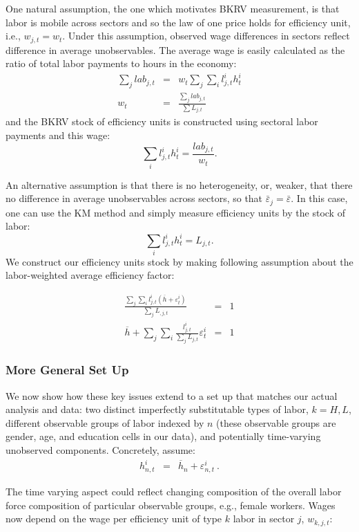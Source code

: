 \documentclass[10pt]{article}
\begin{document}
One natural assumption, the one which motivates BKRV measurement, is that labor is mobile across sectors and so the law of one price holds for efficiency unit, i.e., $w_{j,t}=w_{t}$. Under this assumption, observed wage differences in sectors reflect difference in average unobservables. The average wage is easily calculated as the ratio of total labor payments to hours in the economy:\\
\begin{eqnarray*}
\sum_{j}lab_{j,t} & = & w_{t}\sum_{j}\sum_{i}l_{j,t}^{i}h_{t}^{i}\\
w_{t} & = & \frac{\sum_{j}lab_{j,t}}{\sum L_{j,t}} \, 
\end{eqnarray*}
and the BKRV stock of efficiency units is constructed using sectoral labor payments and this wage:
$$\sum_{i}l_{j,t}^{i}h_{t}^{i}=\frac{lab_{j,t}}{w_{t}}.$$

An alternative assumption is that there is no heterogeneity, or, weaker, that there no difference in average unobservables across sectors, so that $\bar{\varepsilon}_{j}=\bar{\varepsilon}$. In this case, one can use the KM method and simply measure efficiency units by the stock of labor: 
$$\sum_{i}l_{j,t}^{i}h_{t}^{i}=L_{j,t}.$$
We construct our efficiency units stock by making following assumption about the labor-weighted average efficiency factor:

\begin{eqnarray*}
\frac{\sum_{j}\sum_{i}l_{j,t}^{i}\left(\overline{h}+\varepsilon^{i}_{t}\right)}{\sum_{j}L_{,j,t}} & = & 1\\
\overline{h}+\sum_{j}\sum_{i}\frac{l_{j,t}^{i}}{\sum_{j}L_{j,t}}\varepsilon^{i}_{t} & = & 1
\end{eqnarray*}

\subsubsection{More General Set Up}
We now show how these key issues extend to a set up that matches our actual analysis and data: two distinct imperfectly substitutable types of labor, $k=H,L$, different observable groups of labor indexed by $n$ (these observable groups are gender, age, and education cells in our data), and potentially time-varying unobserved components. Concretely, assume:
\begin{eqnarray*}
h_{n,t}^{i} & = & \overline{h}_{n}+\varepsilon_{n,t}^{i} \ .
\end{eqnarray*}

The time varying aspect could reflect changing composition of the overall labor force composition of particular observable groups, e.g., female workers. Wages now depend on the wage per efficiency unit of type $k$ labor in sector $j$, $w_{k,j,t}$: 
\end{document}
